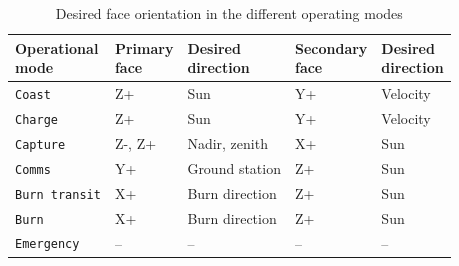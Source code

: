 \begin{table}[htbp]
    \centering
    \caption{Desired face orientation in the different operating modes}
    \label{tab:desired_face_orientation}
    \begin{tabular}{lllll}
        \toprule
        \makecell[l]{Operational\\mode} &
        \makecell[l]{Primary\\face} &
        \makecell[l]{Desired\\direction} &
        \makecell[l]{Secondary\\face} &
        \makecell[l]{Desired\\direction} \\
        \midrule
        \texttt{Coast}        & Z+ & Sun            & Y+ & Velocity \\
        \texttt{Charge}       & Z+ & Sun            & Y+ & Velocity \\
        \texttt{Capture}      & Z-, Z+ & Nadir, zenith   & X+ & Sun \\
        \texttt{Comms}        & Y+ & Ground station & Z+ & Sun \\
        \texttt{Burn transit} & X+ & Burn direction & Z+ & Sun \\
        \texttt{Burn}         & X+ & Burn direction & Z+ & Sun \\
        \texttt{Emergency}    & -- & --             & -- & -- \\
        \bottomrule
    \end{tabular}

    \vspace{0.5em}
\end{table}


